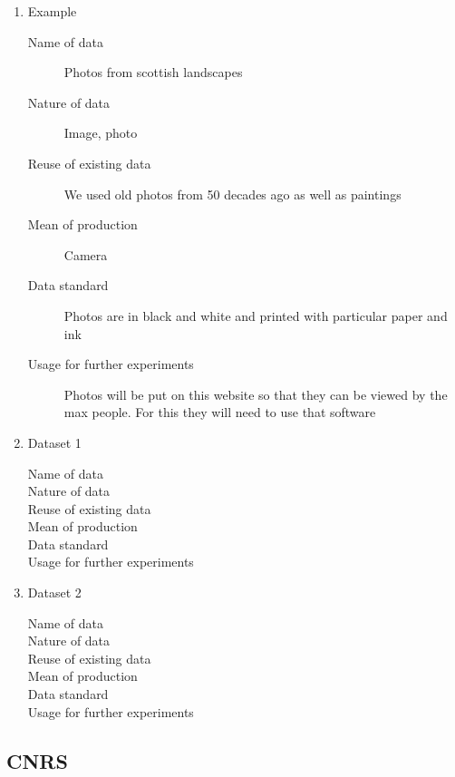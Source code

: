 \documentclass[12pt]{amsbook}
\begin{document}
\begin{enumerate}


\item{Example}


\begin{description}
\item[Name of data] Photos from scottish landscapes
\item[Nature of data] Image, photo
\item[Reuse of existing data] We used old photos from 50 decades ago as well as paintings
\item[Mean of production] Camera
\item[Data standard] Photos are in black and white and printed with particular paper and ink
\item [Usage for further experiments] Photos will be put on this website so that they can be viewed by the max people. For this they will need to use that software
\end{description}


\item {Dataset 1}


\begin{description}
\item[Name of data]
\item[Nature of data]
\item[Reuse of existing data]
\item[Mean of production]
\item[Data standard]
\item [Usage for further experiments]
\end{description}


\item{Dataset 2}


\begin{description}
\item[Name of data]
\item[Nature of data]
\item[Reuse of existing data]
\item[Mean of production]
\item[Data standard]
\item [Usage for further experiments]
\end{description}

\end{enumerate}

\subsection{CNRS}
\end{document}
